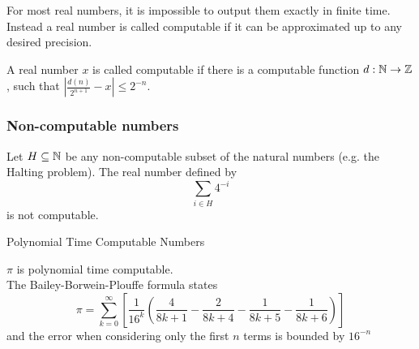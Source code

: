 \begin{frame}
  For most real numbers, it is impossible to output them exactly in finite time.
  Instead a real number is called computable if it can be approximated up to any desired precision.
  \vfill
  \pause
\begin{minipage}{.45\textwidth}
		\begin{figure}
		\centering
    \vfill
		\end{figure}
	\end{minipage}
	\hfill
	\begin{minipage}{.45\textwidth}
	\begin{definition}
		A real number $x$ is called computable if there is a computable function $d:\mathbb{N}\to\mathbb{Z}$, such that $ \left|\frac{d(n)}{2^{n+1}} - x\right|\leq 2^{-n}$.   
	\end{definition}
	\end{minipage}
\end{frame}
\begin{frame}
  \frametitle{Non-computable numbers}
  \begin{example}[Specker]
    Let $H \subseteq \mathbb{N}$ be any non-computable subset of the natural numbers (e.g. the Halting problem).
    \pause
    The real number defined by 
    $$
      \sum_{i \in H} 4^{-i}
    $$
    is not computable.
  \end{example}
\end{frame}
\begin{frame}[t]{Polynomial Time Computable Numbers}
  \begin{example}
  $\pi$ is polynomial time computable. \\
  The Bailey-Borwein-Plouffe formula states
  $$
  \pi = \sum_{k = 0}^{\infty}\left[ \frac{1}{16^k} \left( \frac{4}{8k + 1} - \frac{2}{8k + 4} - \frac{1}{8k + 5} - \frac{1}{8k + 6} \right) \right]
  $$
  and the error when considering only the first $n$ terms is bounded by $16^{-n}$
  \end{example}
\end{frame}
